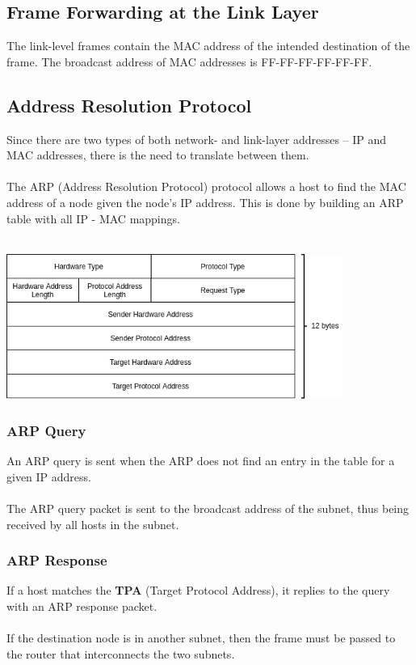 \documentclass{article}
\begin{document}
\subsection{Frame Forwarding at the Link Layer}
The link-level frames contain the MAC address of the intended destination of the frame. The broadcast address of MAC addresses is FF-FF-FF-FF-FF-FF.

\subsection{Address Resolution Protocol}
Since there are two types of both network- and link-layer addresses -- IP and MAC addresses, there is the need to translate between them. \\ \\
The ARP (Address Resolution Protocol) protocol allows a host to find the MAC address of a node given the node's IP address. This is done by building an ARP table with all IP - MAC mappings.\\ \\
	
\centerline{\includegraphics[width=11cm]{./assets/arp.png}}
\vspace{.3cm}

\subsubsection{ARP Query}
An ARP query is sent when the ARP does not find an entry in the table for a given IP address. \\ \\
The ARP query packet is sent to the broadcast address of the subnet, thus being received by all hosts in the subnet.

\subsubsection{ARP Response}
If a host matches the \textbf{TPA} (Target Protocol Address), it replies to the query with an ARP response packet. \\ \\
If the destination node is in another subnet, then the frame must be passed to the router that interconnects the two subnets.
\end{document}
